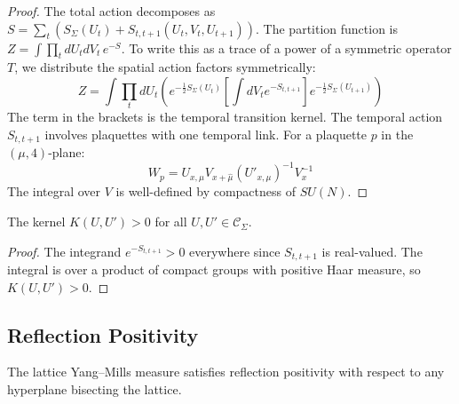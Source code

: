 \begin{proof}
The total action decomposes as $S = \sum_t (S_{\Sigma}(U_t) + S_{t,t+1}(U_t, V_t, U_{t+1}))$.
The partition function is $Z = \int \prod_t dU_t dV_t \, e^{-S}$.
To write this as a trace of a power of a symmetric operator $T$, we distribute the spatial action factors symmetrically:
\[
Z = \int \prod_t dU_t \left( e^{-\frac{1}{2}S_{\Sigma}(U_t)} \left[ \int dV_t e^{-S_{t,t+1}} \right] e^{-\frac{1}{2}S_{\Sigma}(U_{t+1})} \right)
\]
The term in the brackets is the temporal transition kernel.
The temporal action $S_{t,t+1}$ involves plaquettes with one temporal link. For a plaquette $p$ in the $(\mu, 4)$-plane:
\[
W_p = U_{x,\mu} V_{x+\hat{\mu}} (U'_{x,\mu})^{-1} V_x^{-1}
\]
The integral over $V$ is well-defined by compactness of $SU(N)$.
\end{proof}

\begin{lemma}
\label{lem:kernel-positive}
The kernel $K(U, U') > 0$ for all $U, U' \in \mathcal{C}_\Sigma$.
\end{lemma}

\begin{proof}
The integrand $e^{-S_{t,t+1}} > 0$ everywhere since $S_{t,t+1}$ is real-valued.
The integral is over a product of compact groups with positive Haar measure, 
so $K(U, U') > 0$.
\end{proof}

\subsection{Reflection Positivity}

\begin{theorem}
\label{thm:reflection-pos}
\label{thm:rp_wilson}
\label{thm:rp_monotonicity}
\label{lem:log-rp-bound}
\label{thm:reflection-positivity}
The lattice Yang--Mills measure satisfies reflection positivity with respect 
to any hyperplane bisecting the lattice.
\end{theorem}

